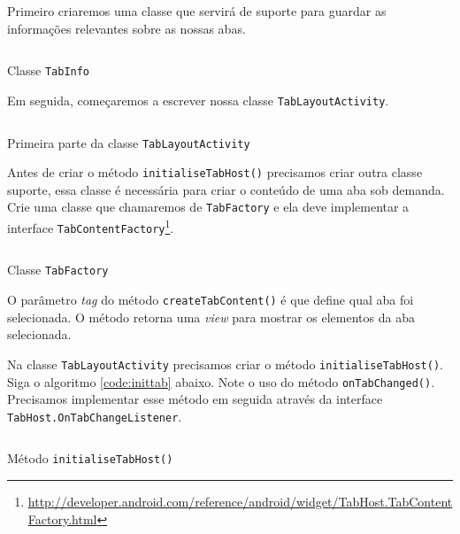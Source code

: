 \documentclass[a4paper,12pt,brazil]{book}
\begin{document}
\begin{singlespace}
	Primeiro criaremos uma classe que servirá de suporte para guardar as informações relevantes sobre as nossas abas.
	
	\begin{listing}[H]
	\inputminted[linenos=true,fontsize=\small,frame=lines, framesep=2mm, tabsize=2,numbersep=5pt]{java}{src/design/tabinfo.java}
	\caption{Classe \texttt{TabInfo}}
	\end{listing}
	
	Em seguida, começaremos a escrever nossa classe \texttt{TabLayoutActivity}.
	
 	\begin{listing}[H]
	\inputminted[linenos=true,fontsize=\small,frame=lines, framesep=2mm, tabsize=2,numbersep=5pt]{java}{src/design/tab-activity1.java}
	\caption{Primeira parte da classe \texttt{TabLayoutActivity}}
	\end{listing}
	
	Antes de criar o método \texttt{initialiseTabHost()} precisamos criar outra classe suporte, essa classe é necessária para criar o conteúdo de uma aba sob demanda. Crie uma classe que chamaremos de \texttt{TabFactory} e ela deve implementar a interface \texttt{TabContentFactory}\footnote{\href{http://developer.android.com/reference/android/widget/TabHost.TabContentFactory.html}{http://developer.android.com/reference/android/widget/TabHost.TabContentFactory.html}}.
	
	\begin{listing}[H]
	\inputminted[linenos=true,fontsize=\small,frame=lines, framesep=2mm, tabsize=2,numbersep=5pt]{java}{src/design/tab-factory.java}
	\caption{Classe \texttt{TabFactory}}
	\end{listing}
	
	O parâmetro \emph{tag} do método \texttt{createTabContent()} é que define qual aba foi selecionada. O método retorna uma \emph{view} para mostrar os elementos da aba selecionada.
	
	Na classe \texttt{TabLayoutActivity} precisamos criar o método \texttt{initialiseTabHost()}. Siga o algoritmo \ref{code:inittab} abaixo. Note o uso do método \texttt{onTabChanged()}. Precisamos implementar esse método em seguida através da interface \texttt{TabHost.OnTabChangeListener}.
	
	\begin{listing}[H]
	\inputminted[linenos=true,fontsize=\small,frame=lines, framesep=2mm, tabsize=2,numbersep=5pt]{java}{src/design/intialiseTabHost.java}
	\caption{Método \texttt{initialiseTabHost()}}
	\label{code:inittab}
	\end{listing}
	

\end{singlespace}
\end{document}
